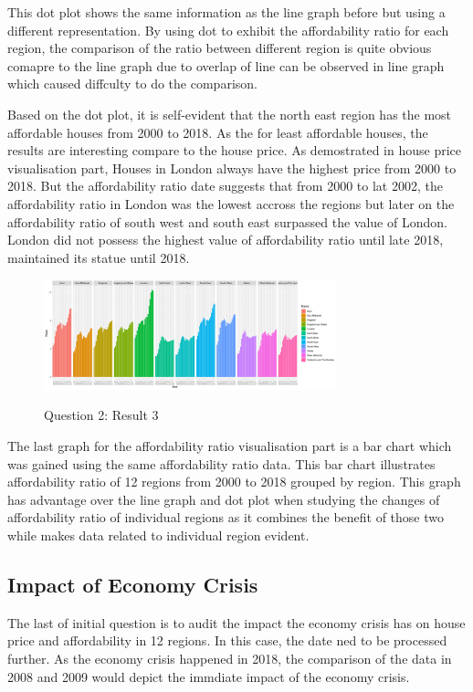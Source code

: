 \documentclass{article}
\begin{document}
This dot plot shows the same information as the line graph before but using a different representation. 
By using dot to exhibit the affordability ratio for each region, the comparison of the ratio between different 
region is quite obvious comapre to the line graph due to overlap of line can be observed in line graph 
which caused diffculty to do the comparison.

Based on the dot plot, it is self-evident that the north east region has the most affordable houses from 2000 
to 2018. As the for least affordable houses, the results are interesting compare to the house price. 
As demostrated in house price visualisation part, Houses in London always have the highest price from 2000 to 2018.
But the affordability ratio date suggests that from 2000 to lat 2002, the affordability ratio in London was the lowest 
accross the regions but later on the affordability ratio of south west and south east surpassed the value of London. 
London did not possess the highest value of affordability ratio until late 2018, maintained its statue until 2018.


\begin{figure}[htb]
  \begin{minipage}[b]{1.0\linewidth}
    \centering
    \centerline{\includegraphics[width=8.5cm]{Q2Geom_gridbar}}
    \centerline{Question 2: Result 3}\medskip
  \end{minipage}
\end{figure}

The last graph for the affordability ratio visualisation part is a bar chart which was gained using the same 
affordability ratio data. This bar chart illustrates affordability ratio of 12 regions from 2000 to 2018 
grouped by region. This graph has advantage over the line graph and dot plot when studying the changes of affordability ratio of individual 
regions as it combines the benefit of those two while makes data related to individual region evident.



\subsection{Impact of Economy Crisis}
The last of initial question is to audit the impact the economy crisis has on house price and affordability
in 12 regions. In this case, the date ned to be processed further. As the economy crisis happened in 2018, 
the comparison of the data in 2008 and 2009 would depict the immdiate impact of the economy crisis. 
\end{document}
